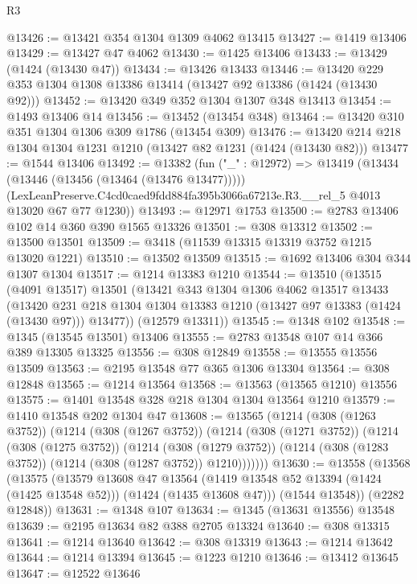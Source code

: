 \begin{lexlean}{R3}
\begin{coremodule}
@13426 := @13421 @354 @1304 @1309 @4062 @13415
@13427 := @1419 @13406
@13429 := @13427 @47 @4062
@13430 := @1425 @13406
@13433 := @13429 (@1424 (@13430 @47))
@13434 := @13426 @13433
@13446 := @13420 @229 @353 @1304 @1308 @13386 @13414 (@13427 @92 @13386 (@1424 (@13430 @92)))
@13452 := @13420 @349 @352 @1304 @1307 @348 @13413
@13454 := @1493 @13406 @14
@13456 := @13452 (@13454 @348)
@13464 := @13420 @310 @351 @1304 @1306 @309 @1786 (@13454 @309)
@13476 := @13420 @214 @218 @1304 @1304 @1231 @1210 (@13427 @82 @1231 (@1424 (@13430 @82)))
@13477 := @1544 @13406
@13492 := @13382
    (fun ("_" : @12972) =>
    @13419
      (@13434 (@13446 (@13456 (@13464 (@13476 @13477)))))
      (LexLeanPreserve.C4cd0caed9fdd884fa395b3066a67213e.R3.__rel_5 @4013 @13020 @67 @77 @1230))
@13493 := @12971 @1753
@13500 := @2783 @13406 @102 @14 @360 @390 @1565 @13326
@13501 := @308 @13312
@13502 := @13500 @13501
@13509 := @3418 (@11539 @13315 @13319 @3752 @1215 @13020 @1221)
@13510 := @13502 @13509
@13515 := @1692 @13406 @304 @344 @1307 @1304
@13517 := @1214 @13383 @1210
@13544 := @13510
    (@13515
      (@4091 @13517)
      @13501
      (@13421
        @343
        @1304
        @1306
        @4062
        @13517
        @13433
        (@13420 @231 @218 @1304 @1304 @13383 @1210 (@13427 @97 @13383 (@1424 (@13430 @97))) @13477))
      (@12579 @13311))
@13545 := @1348 @102
@13548 := @1345 (@13545 @13501) @13406
@13555 := @2783 @13548 @107 @14 @366 @389 @13305 @13325
@13556 := @308 @12849
@13558 := @13555 @13556 @13509
@13563 := @2195 @13548 @77 @365 @1306 @13304
@13564 := @308 @12848
@13565 := @1214 @13564
@13568 := @13563 (@13565 @1210) @13556
@13575 := @1401 @13548 @328 @218 @1304 @1304 @13564 @1210
@13579 := @1410 @13548 @202 @1304 @47
@13608 := @13565
    (@1214
      (@308 (@1263 @3752))
      (@1214
        (@308 (@1267 @3752))
        (@1214
          (@308 (@1271 @3752))
          (@1214
            (@308 (@1275 @3752))
            (@1214
              (@308 (@1279 @3752))
              (@1214 (@308 (@1283 @3752)) (@1214 (@308 (@1287 @3752)) @1210)))))))
@13630 := @13558
    (@13568
      (@13575
        (@13579
          @13608
          @47
          @13564
          (@1419 @13548 @52 @13394 (@1424 (@1425 @13548 @52)))
          (@1424 (@1435 @13608 @47)))
        (@1544 @13548))
      (@2282 @12848))
@13631 := @1348 @107
@13634 := @1345 (@13631 @13556) @13548
@13639 := @2195 @13634 @82 @388 @2705 @13324
@13640 := @308 @13315
@13641 := @1214 @13640
@13642 := @308 @13319
@13643 := @1214 @13642
@13644 := @1214 @13394
@13645 := @1223 @1210
@13646 := @13412 @13645
@13647 := @12522 @13646

\end{coremodule}
\end{lexlean}
